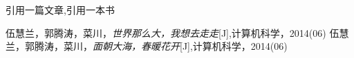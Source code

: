 \documentclass{article}
\begin{document}

引用一篇文章\cite{article1},引用一本书\cite{book1}
	
	\begin{thebibliography}{99}
		伍慧兰，郭腾涛，菜川，\emph{世界那么大，我想去走走}[J],计算机科学，2014(06)
		伍慧兰，郭腾涛，菜川，\emph{面朝大海，春暖花开}[J],计算机科学，2014(06)
	\end{thebibliography}
\end{document}
